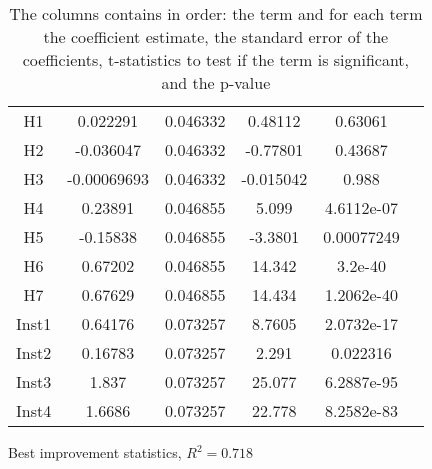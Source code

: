 \documentclass[../main.tex]{subfiles}
\begin{document}
\begin{table}
\begin{adjustbox}{width=\columnwidth,center}
\begin{subtable}{.75\columnwidth}
\begin{tabular}{cccccc}
            H1      & 0.022291  & 0.046332      & 0.48112   & 0.63061   \\
            H2      & -0.036047 & 0.046332      & -0.77801  & 0.43687   \\
            H3      &-0.00069693& 0.046332      & -0.015042 & 0.988     \\
            H4      & 0.23891   & 0.046855      & 5.099     & 4.6112e-07\\
            H5      & -0.15838  & 0.046855      & -3.3801   & 0.00077249\\
            H6      & 0.67202   & 0.046855      & 14.342    & 3.2e-40   \\
            H7      & 0.67629   & 0.046855      & 14.434    & 1.2062e-40\\
            Inst1   & 0.64176   & 0.073257      & 8.7605    & 2.0732e-17\\
            Inst2   & 0.16783   & 0.073257      & 2.291     & 0.022316  \\
            Inst3   & 1.837     & 0.073257      & 25.077    & 6.2887e-95\\
            Inst4   & 1.6686    & 0.073257      & 22.778    & 8.2582e-83\\
            \hline
            \end{tabular}
        \caption{Best improvement statistics, $R^2=0.718$}
        \label{tab:regrBestNormal}
        \end{subtable}
    \end{adjustbox}
    \label{tab:regrNormal}
    \caption*{The columns contains in order: the term and for each term the coefficient estimate, the standard error of the coefficients, t-statistics to test if the term is significant, and the p-value}
\end{table}
\end{document}
